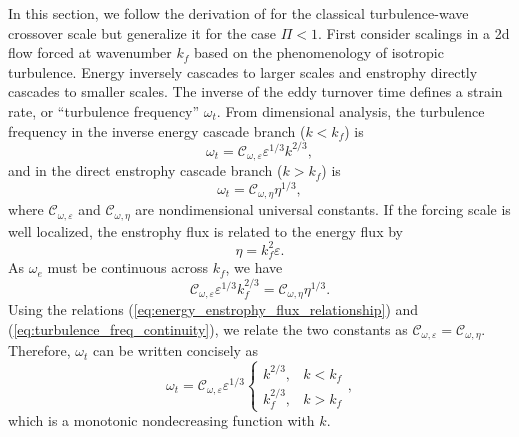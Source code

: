 \documentclass{jfm}
\begin{document}
In this section, we follow the derivation of \citet{Vallis1993} for
the classical turbulence-wave crossover scale but generalize it
for the case $\Pi<1$. First consider scalings in a 2d flow forced
at wavenumber $k_{f}$ based on the phenomenology of isotropic turbulence. 
Energy inversely cascades to larger scales and
enstrophy directly cascades to smaller scales. The inverse of the eddy
turnover time defines a strain rate, or ``turbulence frequency''
$\omega_{t}$. From dimensional analysis, the turbulence frequency in 
the inverse energy cascade branch ($k<k_f$) is
\begin{equation}
\omega_{t}=\mathcal{C}_{\omega,\varepsilon}\varepsilon^{1/3}k^{2/3},\label{eq:eddy_turnover_freq_inverse_cascade}
\end{equation}
and in the direct enstrophy cascade branch ($k>k_f$) is
\begin{equation}
\omega_{t}=\mathcal{C}_{\omega,\eta}\eta^{1/3},\label{eq:eddy_turnover_freq_direct_enstrophy_cascade}
\end{equation}
where $\mathcal{C}_{\omega,\varepsilon}$ and $\mathcal{C}_{\omega,\eta}$
are nondimensional universal constants. If the forcing scale is 
well localized, the enstrophy flux is related to the energy flux by
\begin{equation}
\eta=k_{f}^{2}\varepsilon.\label{eq:energy_enstrophy_flux_relationship}
\end{equation}
As $\omega_{e}$ must be continuous across $k_{f}$, we have
\begin{equation}
\mathcal{C}_{\omega,\varepsilon}\varepsilon^{1/3}k_{f}^{2/3}=\mathcal{C}_{\omega,\eta}\eta^{1/3}.\label{eq:turbulence_freq_continuity}
\end{equation}
Using the relations (\ref{eq:energy_enstrophy_flux_relationship}) and (\ref{eq:turbulence_freq_continuity}),
we relate the two constants as $\mathcal{C}_{\omega,\varepsilon}=\mathcal{C}_{\omega,\eta}$.
Therefore, $\omega_{t}$ can be written concisely as
\begin{equation}
\omega_{t}=\mathcal{C}_{\omega,\varepsilon}\varepsilon^{1/3}\begin{cases}
k^{2/3}, & k<k_{f}\\
k_{f}^{2/3}, & k>k_{f}
\end{cases},\label{eq:eddy_turnover_freq_general_form}
\end{equation}
which is a monotonic nondecreasing function with $k$.
\end{document}
